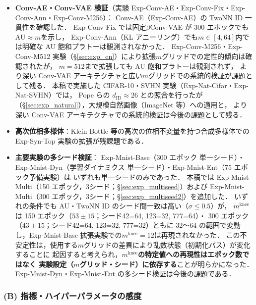 \documentclass[11pt,a4paper]{jsarticle}
\newcommand{\mknee}{m^{\mathrm{knee}}}
\begin{document}
\begin{itemize}
  \item \textbf{Conv-AE・Conv-VAE 検証}（実験 Exp-Conv-AE・Exp-Conv-Fix・Exp-Conv-Ann・Exp-Conv-M256）：
        Conv-AE（Exp-Conv-AE）の TwoNN ID 一貫性を確認した．
        Exp-Conv-Fix では固定$\beta$Conv-VAE が 300 エポックでも AU$\approx m$を示し，
        Exp-Conv-Ann（KL アニーリング）でも$m\in[4,64]$内では明確な AU 飽和プラトーは観測されなかった．
        Exp-Conv-M256・Exp-Conv-M512 実験（§\ref{sec:exp_en}）により拡張$m$グリッドでの定性的傾向は確認されたが，
        $m=512$まで拡張しても AU 飽和プラトーは観測されず，
        より深い Conv-VAE アーキテクチャと広い$m$グリッドでの系統的検証が課題として残る．
        本稿で実施した CIFAR-10・SVHN 実験（Exp-Nat-Cifar・Exp-Nat-SVHN）では，
        Pope ら\cite{pope2021intrinsic}の $d_\mathrm{ID} \approx 26$ との照合を行ったが
        （§\ref{sec:exp_natural}），大規模自然画像（ImageNet 等）への適用と，
        より深い Conv-VAE アーキテクチャでの系統的検証は今後の課題として残る．
  \item \textbf{高次位相多様体}：Klein Bottle 等の高次の位相不変量を持つ合成多様体での
        Exp-Syn-Top 実験の拡張が残課題である．
  \item \textbf{主要実験の多シード検証}：
        Exp-Mnist-Base（300 エポック 単一シード）・Exp-Mnist-Dyn（学習ダイナミクス 単一シード）・Exp-Mnist-Ent（75 エポック予備実験）は
        いずれも単一シードのみであった．
        本稿では Exp-Mnist-Multi（150 エポック，3シード；§\ref{sec:exp_multiseed}）および
        Exp-Mnist-Multi（300 エポック，3シード；§\ref{sec:exp_multiseed2}）を追加した．
        いずれの条件でも AU・TwoNN ID のシード間一致は高い（$\sigma \leq 0.5$）が，
        $\mknee$は 150 エポック（$53 \pm 15$；シード42=64, 123=32, 777=64）・
        300 エポック（$43 \pm 15$；シード42=64, 123=32, 777=32）ともに
        32〜64 の範囲で変動し，Exp-Mnist-Base 拡張実験での$\mknee = 12$は再現されなかった．
        この不安定性は，使用する$m$グリッドの差異により乱数状態（初期化パス）が変化することに
        起因すると考えられ，\textbf{$\mknee$の特定値への再現性はエポック数ではなく
        実験設定（$m$グリッド・シード）に依存する}ことが明らかになった．
        Exp-Mnist-Dyn・Exp-Mnist-Ent の多シード検証は今後の課題である．
\end{itemize}

\subsubsection*{(B) 指標・ハイパーパラメータの感度}
\end{document}
